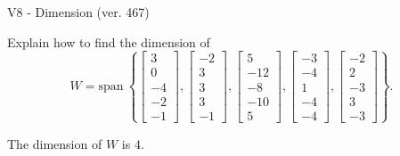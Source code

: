 \begin{exercise}
  \begin{exerciseTitle}V8 - Dimension (ver. 467)\end{exerciseTitle}
  \begin{exerciseStatement}
    Explain how to find the dimension of 
\[W=\mathrm{span}\ \left\{\left[\begin{array}{r}
3 \\
0 \\
-4 \\
-2 \\
-1
\end{array}\right] , \left[\begin{array}{r}
-2 \\
3 \\
3 \\
3 \\
-1
\end{array}\right] , \left[\begin{array}{r}
5 \\
-12 \\
-8 \\
-10 \\
5
\end{array}\right] , \left[\begin{array}{r}
-3 \\
-4 \\
1 \\
-4 \\
-4
\end{array}\right] , \left[\begin{array}{r}
-2 \\
2 \\
-3 \\
3 \\
-3
\end{array}\right]\right\}.\]



  \end{exerciseStatement}
  \begin{exerciseAnswer}
   The dimension of \(W\) is  \(4\).
  


  \end{exerciseAnswer}
\end{exercise}